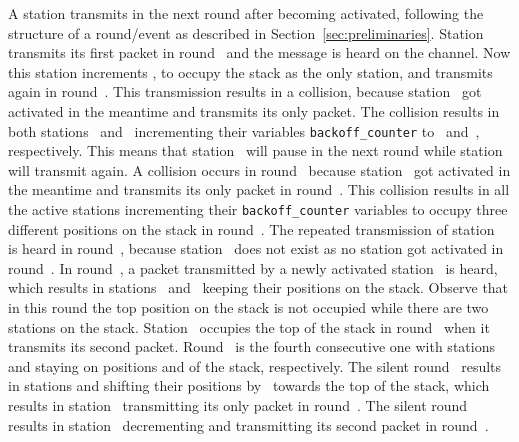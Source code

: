 \documentclass[11pt]{article}
\begin{document}
A station transmits in the next round after becoming activated, following the structure of a round/event as described in Section~\ref{sec:preliminaries}.
Station~ transmits its first packet in round~ and the message is heard on the channel.
Now this station increments , to occupy the stack as the only station, and transmits again in round~.
This transmission results in a collision, because station~ got activated in the meantime and transmits its only packet.
The collision results in both stations~ and~ incrementing their variables \texttt{backoff\_counter} to~ and~, respectively.
This means that station~ will pause in the next round while station~ will transmit again.
A collision occurs in round~ because station~ got activated in the meantime and transmits its only packet in round~.
This collision results in all the active stations incrementing their \texttt{backoff\_counter} variables to occupy three different positions on the stack in round~.
The repeated transmission of station~ is heard in round~, because station~ does not exist as no station got activated in round~.
In round~, a packet transmitted by a newly activated station~ is heard, which results in stations~ and~ keeping their positions on the stack.
Observe that in this round the top position on the stack is not occupied while there are two stations on the stack.
Station~ occupies the top of the stack in round~ when it transmits its second packet.
Round~ is the fourth consecutive one with stations~ and  staying on positions  and  of the stack, respectively.
The silent round~ results in stations  and  shifting their positions by~ towards the top of the stack, which results in station~ transmitting its only packet in round~.
The silent round~ results in station~ decrementing  and transmitting its second packet in round~.
\end{document}
